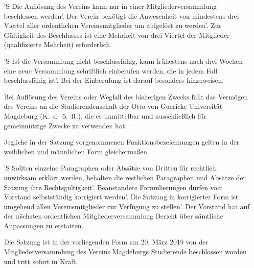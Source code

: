 \documentclass[%
    parskip=half,
]{scrartcl}
\begin{document}
\begin{contract}


'S Die Auflösung des Vereins kann nur in einer Mitgliederversammlung beschlossen werden'.
Der Verein benötigt die Anwesenheit von mindestens drei Viertel aller ordentlichen Vereinsmitglieder um aufgelöst zu werden'.
Zur Gültigkeit des Beschlusses ist eine Mehrheit von drei Viertel der Mitglieder (qualifizierte Mehrheit) erforderlich.

'S Ist die Versammlung nicht beschlussfähig, kann frühestens nach drei Wochen eine neue Versammlung schriftlich einberufen werden, die in jedem Fall beschlussfähig ist'.
Bei der Einberufung ist darauf besonders hinzuweisen.

Bei Auflösung des Vereins oder Wegfall des bisherigen Zwecks fällt das Vermögen des Vereins an die Studierendenschaft der Otto-von-Guericke-Universität Magdeburg (K.~d.~ö.~R.), die es unmittelbar und ausschließlich für gemeinnützige Zwecke zu verwenden hat.


Jegliche in der Satzung vorgenommenen Funktionsbezeichnungen gelten in der weiblichen und männlichen Form gleichermaßen.


'S Sollten einzelne Paragraphen oder Absätze von Dritten für rechtlich unwirksam erklärt werden, behalten die restlichen Paragraphen und Absätze der Satzung ihre Rechtsgültigkeit'.
Beanstandete Formulierungen dürfen vom Vorstand selbstständig korrigiert werden'.
Die Satzung in korrigierter Form ist umgehend allen Vereinsmitglieder zur Verfügung zu stellen'.
Der Vorstand hat auf der nächsten ordentlichen Mitgliederversammlung Bericht über sämtliche Anpassungen zu erstatten.


Die Satzung ist in der vorliegenden Form am 20. März 2019 von der Mitgliederversammlung des Vereins \glqq Magdeburgs Studierende\grqq{} beschlossen worden und tritt sofort in Kraft.

\end{contract}
\end{document}
